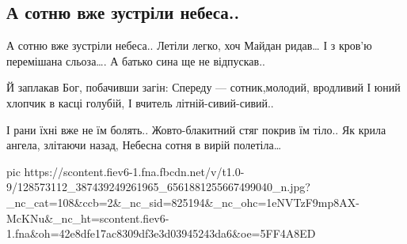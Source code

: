 
 
 
 
 

\subsection{А сотню вже зустріли небеса..}


\begin{multicols}{2}
	\obeycr
А сотню вже зустріли небеса..
Летіли легко, хоч Майдан ридав…
І з кров'ю перемішана сльоза….
А батько сина ще не відпускав..

Й заплакав Бог, побачивши загін:
Спереду — сотник,молодий, вродливий
І юний хлопчик в касці голубій,
І вчитель літній-сивий-сивий..

І рани їхні вже не їм болять..
Жовто-блакитний стяг покрив їм тіло..
Як крила ангела, злітаючи назад,
Небесна сотня в вирій полетіла…
	\restorecr
\end{multicols}

\ifcmt
pic https://scontent.fiev6-1.fna.fbcdn.net/v/t1.0-9/128573112_387439249261965_6561881255667499040_n.jpg?_nc_cat=108&ccb=2&_nc_sid=825194&_nc_ohc=1eNVTzF9mp8AX-McKNu&_nc_ht=scontent.fiev6-1.fna&oh=42e8dfe17ac8309df3e3d03945243da6&oe=5FF4A8ED
\fi
